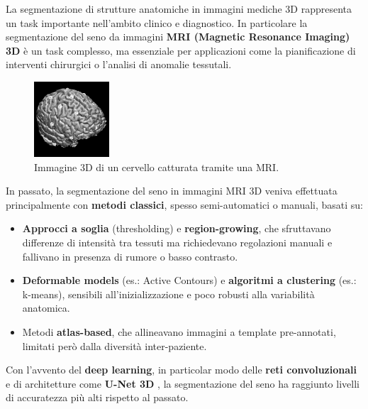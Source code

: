 
La segmentazione di strutture anatomiche in immagini mediche 3D rappresenta un task importante nell’ambito clinico e diagnostico. In particolare la segmentazione del seno da immagini \textbf{MRI (Magnetic Resonance Imaging) 3D} è un task complesso, ma essenziale per applicazioni come la pianificazione di interventi chirurgici o l’analisi di anomalie tessutali.

\begin{figure} 
  	\centering 
 	\includegraphics[width=0.25\textwidth]{images/2025-08-08-20-08-17.png}  
	\caption{Immagine 3D di un cervello catturata tramite una MRI. \cite{brain_mri_3d}}
 \end{figure} 




In passato, la segmentazione del seno in immagini MRI 3D veniva effettuata principalmente con \textbf{metodi classici}, spesso semi-automatici o manuali, basati su:

\begin{itemize}
	\item \textbf{Approcci a soglia} (thresholding) e \textbf{region-growing}, che sfruttavano differenze di intensità tra tessuti ma richiedevano regolazioni manuali e fallivano in presenza di rumore o basso contrasto.
	\item \textbf{Deformable models} (es.: Active Contours) e \textbf{algoritmi a clustering} (es.: k-means), sensibili all’inizializzazione e poco robusti alla variabilità anatomica.
	\item Metodi \textbf{atlas-based}, che allineavano immagini a template pre-annotati, limitati però dalla diversità inter-paziente.
\end{itemize}

Con l’avvento del \textbf{deep learning}, in particolar modo delle \textbf{reti convoluzionali} e di architetture come \textbf{U-Net 3D} \cite{chen2021transunet}, la segmentazione del seno ha raggiunto livelli di accuratezza più alti rispetto al passato. 






